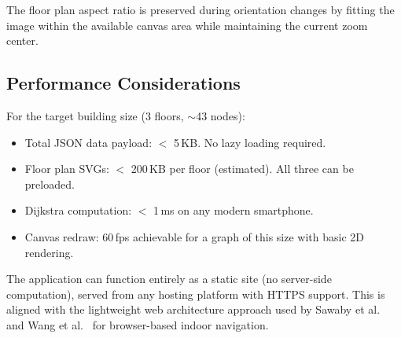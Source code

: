 The floor plan aspect ratio is preserved during orientation changes by fitting the image within the available canvas area while maintaining the current zoom center.

\subsection{Performance Considerations}

For the target building size (3 floors, $\sim$43 nodes):

\begin{itemize}
  \item Total JSON data payload: $<$ 5\,KB. No lazy loading required.
  \item Floor plan SVGs: $<$ 200\,KB per floor (estimated). All three can be preloaded.
  \item Dijkstra computation: $<$ 1\,ms on any modern smartphone.
  \item Canvas redraw: 60\,fps achievable for a graph of this size with basic 2D rendering.
\end{itemize}

The application can function entirely as a static site (no server-side computation), served from any hosting platform with HTTPS support. This is aligned with the lightweight web architecture approach used by Sawaby et al.\ \cite{Sawaby2019} and Wang et al.\ \cite{Wang2014} for browser-based indoor navigation.
